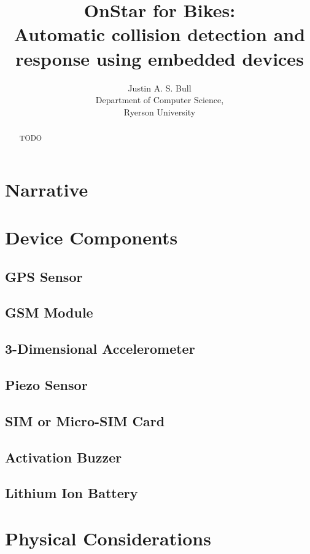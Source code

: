 \documentclass[titlepage]{article}   	%
\title{OnStar for Bikes:\\
	Automatic collision detection and response using embedded devices}
\author{Justin A. S. Bull\\
	Department of Computer Science,\\
	Ryerson University\\}
\begin{document}
\maketitle

\begin{abstract}
TODO
\end{abstract}

\section{Narrative}

\section{Device Components}
\subsection{GPS Sensor}
\subsection{GSM Module}
\subsection{3-Dimensional Accelerometer}
\subsection{Piezo Sensor}
\subsection{SIM or Micro-SIM Card}
\subsection{Activation Buzzer}
\subsection{Lithium Ion Battery}

\section{Physical Considerations}
\end{document}

